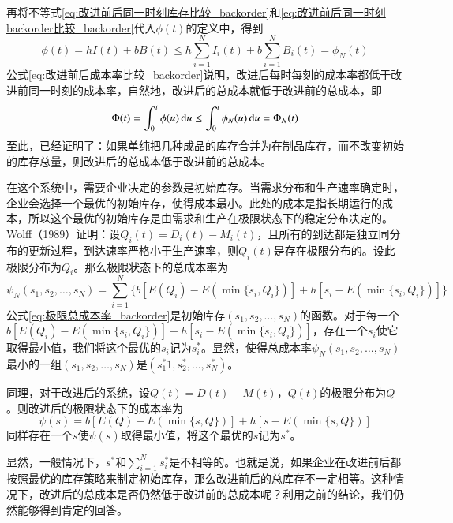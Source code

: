再将不等式\ref{eq:改进前后同一时刻库存比较_backorder}和\ref{eq:改进前后同一时刻backorder比较_backorder}代入$\phi(t)$的定义中，得到
\begin{equation}
\phi(t) = hI(t)+bB(t) \leq h\sum_{i=1}^N I_i(t) + b\sum_{i=1}^N B_i(t) = \phi_N(t)
\label{eq:改进前后成本率比较_backorder}
\end{equation}
公式\ref{eq:改进前后成本率比较_backorder}说明，改进后每时每刻的成本率都低于改进前同一时刻的成本率，自然地，改进后的总成本就低于改进前的总成本，即
\begin{equation}
\Phi(t)=\int_0^t\phi(u)\operatorname{d\!} u \leq \int_0^t\phi_N(u)\operatorname{d\!} u = \Phi_N(t)
\label{eq:改进前后成本比较_backorder}
\end{equation}
至此，已经证明了：如果单纯把几种成品的库存合并为在制品库存，而不改变初始的库存总量，则改进后的总成本低于改进前的总成本。

在这个系统中，需要企业决定的参数是初始库存。当需求分布和生产速率确定时，企业会选择一个最优的初始库存，使得成本最小。此处的成本是指长期运行的成本，所以这个最优的初始库存是由需求和生产在极限状态下的稳定分布决定的。Wolff（1989）\cite{wolff_stochastic_1989}证明：设$Q_i(t)=D_i(t)-M_i(t)$，且所有的到达都是独立同分布的更新过程，到达速率严格小于生产速率，则$Q_i(t)$是存在极限分布的。设此极限分布为$Q_i$。那么极限状态下的总成本率为
\begin{equation}
\psi_N(s_1,s_2,\ldots,s_N) = \sum_{i=1}^N\Big\{b[E(Q_i)-E(\min\{s_i,Q_i\})] + h[s_i - E(\min\{s_i,Q_i\})]\Big\}
\label{eq:极限总成本率_backorder}
\end{equation}
公式\ref{eq:极限总成本率_backorder}是初始库存$(s_1,s_2,\ldots,s_N)$的函数。对于每一个$b[E(Q_i)-E(\min\{s_i,Q_i\})] + h[s_i - E(\min\{s_i,Q_i\})]$，存在一个$s_i$使它取得最小值，我们将这个最优的$s_i$记为$s_i^*$。显然，使得总成本率$\psi_N(s_1,s_2,\ldots,s_N)$最小的一组$(s_1,s_2,\ldots,s_N)$是$(s_1^*1,s_2^*,\ldots,s_N^*)$。

同理，对于改进后的系统，设$Q(t)=D(t)-M(t)$，$Q(t)$的极限分布为$Q$。则改进后的极限状态下的成本率为
\begin{equation}
\psi(s) = b[E(Q)-E(\min\{s,Q\})] + h[s - E(\min\{s,Q\})]
\label{eq:改进后极限总成本率_backorder}
\end{equation}
同样存在一个$s$使$\psi(s)$取得最小值，将这个最优的$s$记为$s^*$。

显然，一般情况下，$s^*$和$\sum_{i=1}^Ns_i^*$是不相等的。也就是说，如果企业在改进前后都按照最优的库存策略来制定初始库存，那么改进前后的总库存不一定相等。这种情况下，改进后的总成本是否仍然低于改进前的总成本呢？利用之前的结论，我们仍然能够得到肯定的回答。

